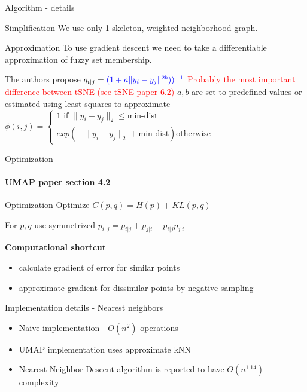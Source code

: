 \documentclass[unknownkeysallowed]{beamer}
\begin{document}
\begin{frame}{Algorithm - details}

    \begin{block}{Simplification}
    We use only 1-skeleton, weighted neighborhood graph.
    \end{block}

    \begin{block}{\textcolor{red}{\danger} Approximation \textcolor{red}{\danger}}
    To use gradient descent we need to take a differentiable approximation of fuzzy set membership. 

    The authors propose $q_{i|j} = \textcolor{blue}{(1 + a\|y_i - y_j\|^{2b}))^{-1}}$
    \break
    \textcolor{red}{Probably the most important difference between tSNE (see tSNE paper 6.2)}
    \break
	$a, b$ are set to predefined values or estimated using least squares to approximate
	\break
    $\phi(i, j) = 
    \begin{cases*}
        1 \textrm{  if } \|y_i - y_j\|_2 \leq \textrm{min-dist} \\
        exp(-\|y_i - y_j\|_2 + \textrm{min-dist}) \textrm{otherwise}
    \end{cases*}
    $
    \end{block}

\end{frame}

\begin{frame}{Optimization}
\framesubtitle{UMAP paper section 4.2}
	\begin{block}{Optimization}
    Optimize $C(p, q) = H(p) + KL(p, q)$

    For $p, q$ use symmetrized $p_{i,j} = p_{i|j} + p_{j|i} - p_{i|j} p_{j|i}$

    \textbf{Computational shortcut}
    \begin{itemize}
        \item calculate gradient of error for similar points
        \item approximate gradient for dissimilar points by negative sampling
    \end{itemize}

    \end{block}

	\begin{block}{Implementation details - Nearest neighbors}
	\begin{itemize}
        \item Naive implementation - $O(n^2)$ operations
        \item UMAP implementation uses approximate kNN 	
        \item Nearest Neighbor Descent algorithm is reported to have $O(n^{1.14})$ complexity
    \end{itemize}
	\end{block}
    

\end{frame}
\end{document}
